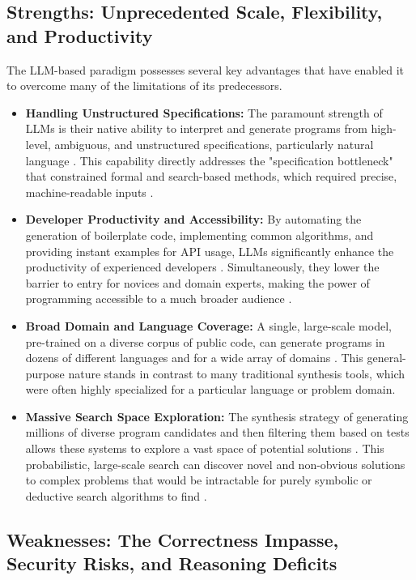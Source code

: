 \documentclass[12pt, a4paper]{report}
\begin{document}
\subsection{Strengths: Unprecedented Scale, Flexibility, and Productivity}

The LLM-based paradigm possesses several key advantages that have enabled it to overcome many of the limitations of its predecessors.
\begin{itemize}
    \item \textbf{Handling Unstructured Specifications:} The paramount strength of LLMs is their native ability to interpret and generate programs from high-level, ambiguous, and unstructured specifications, particularly natural language \citep{gulwani2017program}. This capability directly addresses the "specification bottleneck" that constrained formal and search-based methods, which required precise, machine-readable inputs \citep{gulwani2017program}.
    \item \textbf{Developer Productivity and Accessibility:} By automating the generation of boilerplate code, implementing common algorithms, and providing instant examples for API usage, LLMs significantly enhance the productivity of experienced developers \citep{huang2023jensen}. Simultaneously, they lower the barrier to entry for novices and domain experts, making the power of programming accessible to a much broader audience \citep{huang2023jensen}.
    \item \textbf{Broad Domain and Language Coverage:} A single, large-scale model, pre-trained on a diverse corpus of public code, can generate programs in dozens of different languages and for a wide array of domains \citep{chen2021evaluating}. This general-purpose nature stands in contrast to many traditional synthesis tools, which were often highly specialized for a particular language or problem domain.
    \item \textbf{Massive Search Space Exploration:} The synthesis strategy of generating millions of diverse program candidates and then filtering them based on tests allows these systems to explore a vast space of potential solutions \citep{li2022competition}. This probabilistic, large-scale search can discover novel and non-obvious solutions to complex problems that would be intractable for purely symbolic or deductive search algorithms to find \citep{zhang2024algo}.
\end{itemize}

\subsection{Weaknesses: The Correctness Impasse, Security Risks, and Reasoning Deficits}
\end{document}
